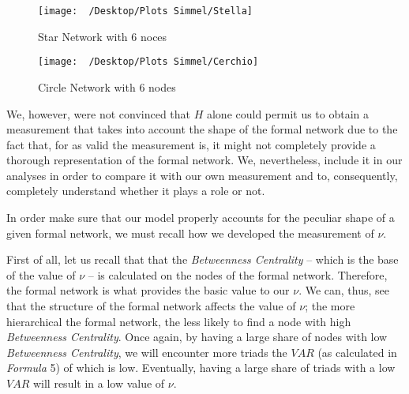 \documentclass{article}
\begin{document}
\begin{figure}
\centering
\texttt{[image: ~/Desktop/Plots Simmel/Stella]}\caption{Star Network with 6 noces}
\end{figure}

\begin{figure}
\centering
\texttt{[image: ~/Desktop/Plots Simmel/Cerchio]}\caption{Circle Network with 6 nodes}
\end{figure}

We, however, were not convinced that $H$ alone could permit us to obtain a measurement that takes into account the shape of the formal network due to the fact that, for as valid the measurement is, it might not completely provide a thorough representation of the formal network. We, nevertheless, include it in our analyses in order to compare it with our own measurement and to, consequently, completely understand whether it plays a role or not.

In order make sure that our model properly accounts for the peculiar shape of a given formal network, we must recall how we developed the measurement of $\nu$.

First of all, let us recall that that the \emph{Betweenness Centrality} – which is the base of the value of $\nu$ – is calculated on the nodes of the formal network. Therefore, the formal network is what provides the basic value to our $\nu$. We can, thus, see that the structure of the formal network affects the value of $\nu$; the more hierarchical the formal network, the less likely to find a node with high \emph{Betweenness Centrality}. Once again, by having a large share of nodes with low \emph{Betweenness Centrality}, we will encounter more triads the $VAR$ (as calculated in \emph{Formula} 5) of which is low. Eventually, having a large share of triads with a low $VAR$ will result in a low value of $\nu$. 
\end{document}
